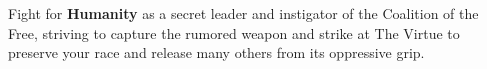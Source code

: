 \begin{center}
\begin{minipage}[c]{1in}
\end{minipage}%
\hspace{2em}%
\begin{minipage}[c]{4in}
  Fight for \textbf{Humanity} as a secret leader and instigator of the
  Coalition of the Free, striving to capture the rumored weapon and
  strike at The Virtue to preserve your race and release many others
  from its oppressive grip.
\end{minipage}

\bigskip
  

\end{center}
